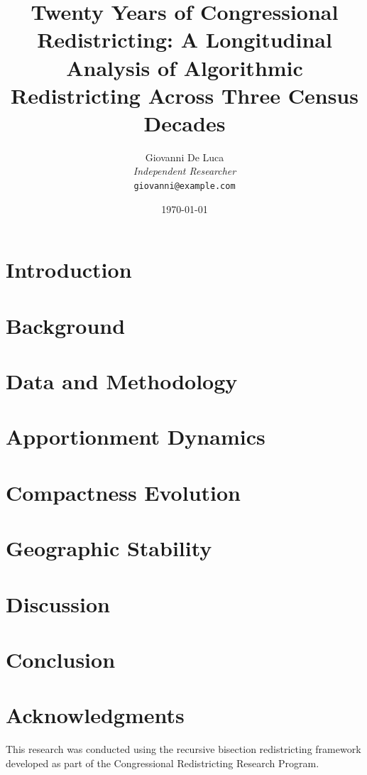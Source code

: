 \documentclass[11pt]{article}
\title{Twenty Years of Congressional Redistricting: A Longitudinal Analysis of Algorithmic Redistricting Across Three Census Decades}
\author{
    Giovanni De Luca \\
    \textit{Independent Researcher} \\
    \texttt{giovanni@example.com}
}
\date{\today}
\begin{document}
\maketitle

\begin{abstract}

\end{abstract}

\section{Introduction}


\section{Background}


\section{Data and Methodology}


\section{Apportionment Dynamics}


\section{Compactness Evolution}


\section{Geographic Stability}


\section{Discussion}


\section{Conclusion}


\section*{Acknowledgments}
This research was conducted using the recursive bisection redistricting framework developed as part of the Congressional Redistricting Research Program.
\end{document}

